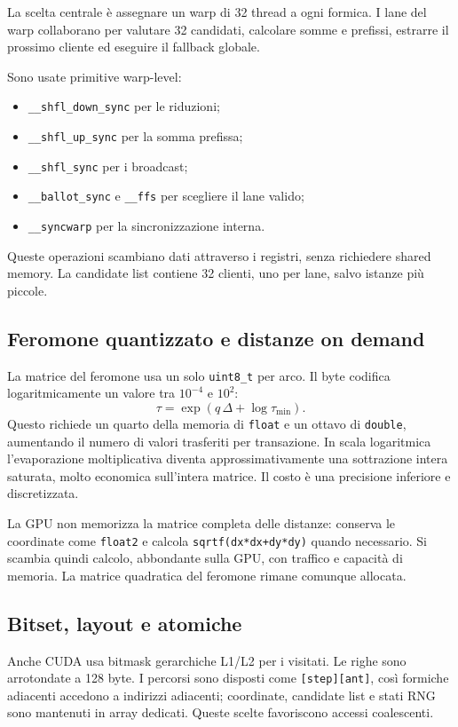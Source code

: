 \documentclass[11pt,a4paper]{article}
\begin{document}
La scelta centrale è assegnare un warp di 32 thread a ogni formica. I lane del
warp collaborano per valutare 32 candidati, calcolare somme e prefissi, estrarre
il prossimo cliente ed eseguire il fallback globale.

Sono usate primitive warp-level:
\begin{itemize}
  \item \texttt{\_\_shfl\_down\_sync} per le riduzioni;
  \item \texttt{\_\_shfl\_up\_sync} per la somma prefissa;
  \item \texttt{\_\_shfl\_sync} per i broadcast;
  \item \texttt{\_\_ballot\_sync} e \texttt{\_\_ffs} per scegliere il lane valido;
  \item \texttt{\_\_syncwarp} per la sincronizzazione interna.
\end{itemize}
Queste operazioni scambiano dati attraverso i registri, senza richiedere shared
memory. La candidate list contiene 32 clienti, uno per lane, salvo istanze più
piccole.

\subsection{Feromone quantizzato e distanze on demand}

La matrice del feromone usa un solo \texttt{uint8\_t} per arco. Il byte codifica
logaritmicamente un valore tra $10^{-4}$ e $10^2$:
\[
  \tau=\exp(q\,\Delta+\log\tau_{\min}).
\]
Questo richiede un quarto della memoria di \texttt{float} e un ottavo di
\texttt{double}, aumentando il numero di valori trasferiti per transazione.
In scala logaritmica l'evaporazione moltiplicativa diventa approssimativamente
una sottrazione intera saturata, molto economica sull'intera matrice. Il costo è
una precisione inferiore e discretizzata.

La GPU non memorizza la matrice completa delle distanze: conserva le coordinate
come \texttt{float2} e calcola \texttt{sqrtf(dx*dx+dy*dy)} quando necessario.
Si scambia quindi calcolo, abbondante sulla GPU, con traffico e capacità di
memoria. La matrice quadratica del feromone rimane comunque allocata.

\subsection{Bitset, layout e atomiche}

Anche CUDA usa bitmask gerarchiche L1/L2 per i visitati. Le righe sono arrotondate
a 128 byte. I percorsi sono disposti come \texttt{[step][ant]}, così formiche
adiacenti accedono a indirizzi adiacenti; coordinate, candidate list e stati RNG
sono mantenuti in array dedicati. Queste scelte favoriscono accessi coalescenti.
\end{document}
